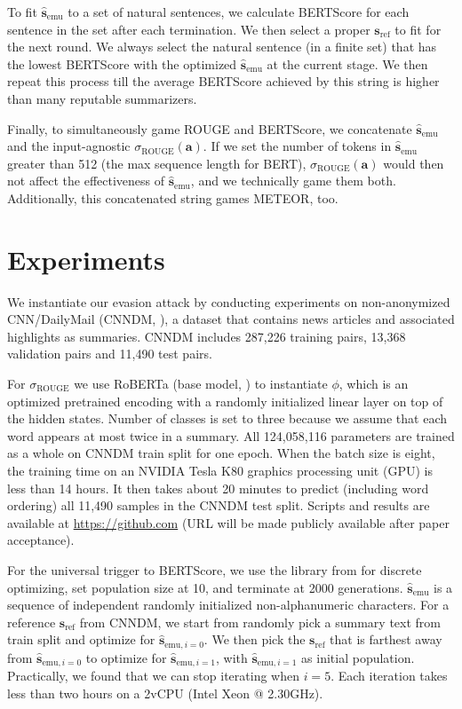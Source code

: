 \documentclass[11pt]{article}
\theoremstyle{remark}
\begin{document}
To fit $\mathbf{\hat{s}}_\text{emu}$ to a set of natural sentences, we calculate BERTScore for each sentence in the set after each termination. We then select a proper $\mathbf{s}_\text{ref}$ to fit for the next round. We always select the natural sentence (in a finite set) that has the lowest BERTScore with the optimized $\mathbf{\hat{s}}_\text{emu}$ at the current stage. We then repeat this process till the average BERTScore achieved by this string is higher than many reputable summarizers.

Finally, to simultaneously game ROUGE and BERTScore, we concatenate $\mathbf{\hat{s}}_\text{emu}$ and the input-agnostic $\sigma_\text{ROUGE}(\mathbf{a})$. If we set the number of tokens in $\mathbf{\hat{s}}_\text{emu}$ greater than 512 (the max sequence length for BERT), $\sigma_\text{ROUGE}(\mathbf{a})$ would then not affect the effectiveness of $\mathbf{\hat{s}}_\text{emu}$, and we technically game them both. Additionally, this concatenated string games METEOR, too.

\section{Experiments}
We instantiate our evasion attack by conducting experiments on non-anonymized CNN/DailyMail (CNNDM, \citealp{nallapati2016abstractive,see-etal-2017-get}), a dataset that contains news articles and associated highlights as summaries. CNNDM includes 287,226 training pairs, 13,368 validation pairs and 11,490 test pairs. 


For $\sigma_\text{ROUGE}$ we use RoBERTa (base model, \citealp{liu2019roberta}) to instantiate $\phi$, which is an optimized pretrained encoding with a randomly initialized linear layer on top of the hidden states. Number of classes is set to three because we assume that each word appears at most twice in a summary. All 124,058,116 parameters are trained as a whole on CNNDM train split for one epoch. When the batch size is eight, the training time on an NVIDIA Tesla K80 graphics processing unit (GPU) is less than 14 hours. It then takes about 20 minutes to predict (including word ordering) all 11,490 samples in the CNNDM test split. Scripts and results are available at
\url{https://github.com} (URL will be made publicly available after paper acceptance).

For the universal trigger to BERTScore, we use the library from \citet{pymoo} for discrete optimizing, set population size at 10, and terminate at 2000 generations. $\mathbf{\hat{s}}_\text{emu}$ is a sequence of independent randomly initialized non-alphanumeric characters. For a reference $\mathbf{s}_\text{ref}$ from CNNDM, we start from randomly pick a summary text from train split and optimize for $\mathbf{\hat{s}}_{\text{emu}, i=0}$. We then pick the $\mathbf{s}_\text{ref}$ that is farthest away from $\mathbf{\hat{s}}_{\text{emu}, i=0}$ to optimize for $\mathbf{\hat{s}}_{\text{emu}, i=1}$, with $\mathbf{\hat{s}}_{\text{emu}, i=1}$ as initial population. Practically, we found that we can stop iterating when $i = 5$. Each iteration takes less than two hours on a 2vCPU (Intel Xeon @ 2.30GHz).
\end{document}
